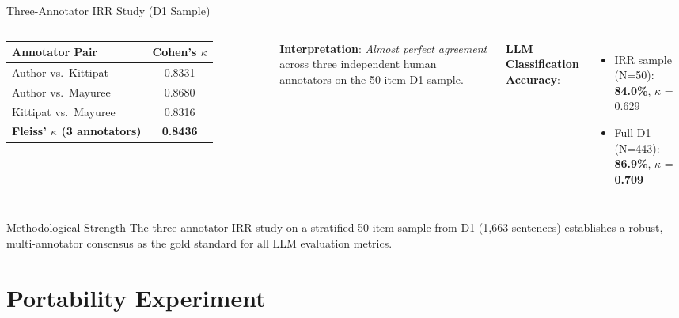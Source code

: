 \documentclass[aspectratio=169, 10pt]{beamer}
\begin{document}
\begin{frame}{Three-Annotator IRR Study (D1 Sample)}
    \begin{columns}
        \begin{table}[]
            \centering
            \small
            \begin{tabular}{lc}
                \toprule
                \textbf{Annotator Pair} & \textbf{Cohen's $\kappa$} \\
                \midrule
                Author vs.\ Kittipat & 0.8331 \\
                Author vs.\ Mayuree & 0.8680 \\
                Kittipat vs.\ Mayuree & 0.8316 \\
                \midrule
                \textbf{Fleiss' $\kappa$ (3 annotators)} & \textbf{0.8436} \\
                \bottomrule
            \end{tabular}
        \end{table}
        
        \textbf{Interpretation}: \textit{Almost perfect agreement} across three independent human annotators on the 50-item D1 sample.

        \vspace{0.3cm}
        \textbf{LLM Classification Accuracy}:
        \begin{itemize}
            \item IRR sample (N=50): \textbf{84.0\%}, $\kappa$ = 0.629
            \item Full D1 (N=443): \textbf{86.9\%}, $\kappa$ = \textbf{0.709}
        \end{itemize}
    \end{columns}

    \vspace{0.4cm}
    \begin{exampleblock}{Methodological Strength}
        The three-annotator IRR study on a stratified 50-item sample from D1 (1,663 sentences) establishes a robust, multi-annotator consensus as the gold standard for all LLM evaluation metrics.
    \end{exampleblock}
\end{frame}

\section{Portability Experiment}
\end{document}
